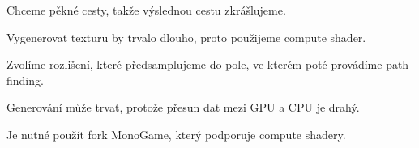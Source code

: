 Chceme pěkné cesty, takže výslednou cestu zkrášlujeme.

Vygenerovat texturu by trvalo dlouho, proto použijeme compute shader.

Zvolíme rozlišení, které předsamplujeme do pole, ve kterém poté provádíme path-finding.

Generování může trvat, protože přesun dat mezi GPU a CPU je drahý.

Je nutné použít fork MonoGame, který podporuje compute shadery.






























